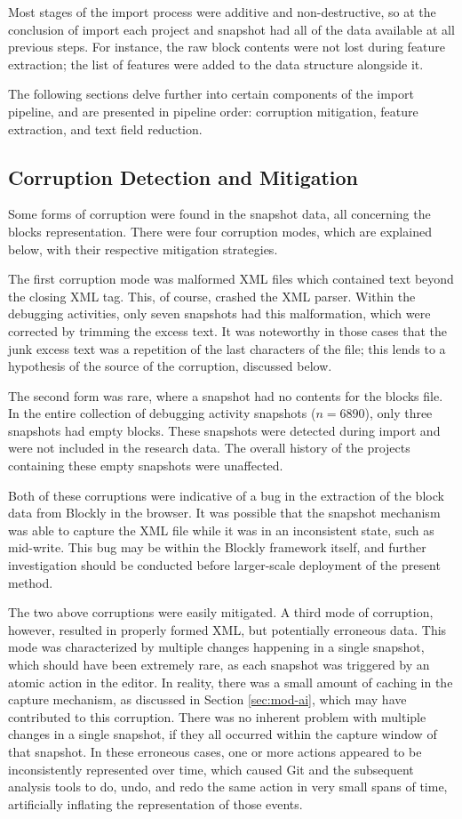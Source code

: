 Most stages of the import process were additive and non-destructive, so at the conclusion of import each project and snapshot had all of the data available at all previous steps. For instance, the raw block contents were not lost during feature extraction; the list of features were added to the data structure alongside it. 

The following sections delve further into certain components of the import pipeline, and are presented in pipeline order: corruption mitigation, feature extraction, and text field reduction.


\subsection{Corruption Detection and Mitigation}
Some forms of corruption were found in the snapshot data, all concerning the blocks representation. There were four corruption modes, which are explained below, with their respective mitigation strategies.

The first corruption mode was malformed XML files which contained text beyond the closing XML tag. This, of course, crashed the XML parser. Within the debugging activities, only seven snapshots had this malformation, which were corrected by trimming the excess text. It was noteworthy in those cases that the junk excess text was a repetition of the last characters of the file; this lends to a hypothesis of the source of the corruption, discussed below.

The second form was rare, where a snapshot had no contents for the blocks file. In the entire collection of debugging activity snapshots ($n = 6890$), only three snapshots had empty blocks. These snapshots were detected during import and were not included in the research data. The overall history of the projects containing these empty snapshots were unaffected. 

Both of these corruptions were indicative of a bug in the extraction of the block data from Blockly in the browser. It was possible that the snapshot mechanism was able to capture the XML file while it was in an inconsistent state, such as mid-write. This bug may be within the Blockly framework itself, and further investigation should be conducted before larger-scale deployment of the present method.

The two above corruptions were easily mitigated. A third mode of corruption, however, resulted in properly formed XML, but potentially erroneous data. This mode was characterized by multiple changes happening in a single snapshot, which should have been extremely rare, as each snapshot was triggered by an atomic action in the editor. In reality, there was a small amount of caching in the capture mechanism, as discussed in Section \ref{sec:mod-ai}, which may have contributed to this corruption. There was no inherent problem with multiple changes in a single snapshot, if they all occurred within the capture window of that snapshot. In these erroneous cases, one or more actions appeared to be inconsistently represented over time, which caused Git and the subsequent analysis tools to do, undo, and redo the same action in very small spans of time, artificially inflating the representation of those events. 

